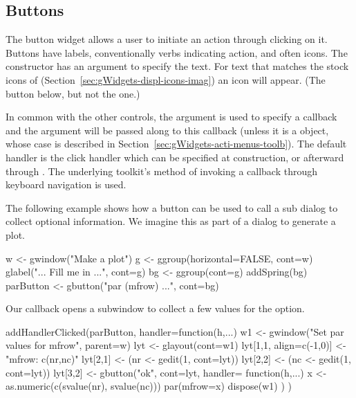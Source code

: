 \subsection{Buttons}
\label{sec:gWidgets-buttons}

The button widget allows a user to initiate an action through clicking
on it. Buttons have labels, conventionally verbs indicating action,
and often icons. The  constructor has an argument
 to specify the text.  For text that matches
the stock icons of 
(Section~\ref{sec:gWidgets-displ-icons-imag}) an icon will
appear. (The  button below, but not the  one.)

In common with the other controls, the argument
 is used to specify a callback and the
 argument will be passed along to this
callback (unless it is a  object, whose case is
described in Section~\ref{sec:gWidgets-acti-menus-toolb}).  The
default handler is the click handler which can be specified at
construction, or afterward through
. The underlying toolkit's method
of invoking a callback through keyboard navigation is used.

The following example shows how a button can be used to call a sub
dialog to collect optional information. We imagine this as part of a
dialog to generate a plot.

\begin{Schunk}
\begin{Sinput}
 w <- gwindow("Make a plot")
 g <- ggroup(horizontal=FALSE, cont=w)
 glabel("... Fill me in ...", cont=g)
 bg <- ggroup(cont=g)
 addSpring(bg)
 parButton <- gbutton("par (mfrow) ...", cont=bg)
\end{Sinput}
\end{Schunk}
Our callback opens a subwindow to collect a few values for the
 option.
\begin{Schunk}
\begin{Sinput}
 addHandlerClicked(parButton, handler=function(h,...) {
   w1 <- gwindow("Set par values for mfrow", parent=w)
   lyt <- glayout(cont=w1)
   lyt[1,1, align=c(-1,0)] <- "mfrow: c(nr,nc)"
   lyt[2,1] <- (nr <- gedit(1, cont=lyt))
   lyt[2,2] <- (nc <- gedit(1, cont=lyt))
   lyt[3,2] <- gbutton("ok", cont=lyt, handler=
                 function(h,...) {
                   x <- as.numeric(c(svalue(nr), svalue(nc)))
                   par(mfrow=x)
                   dispose(w1)
                 })
 })
\end{Sinput}
\end{Schunk}



